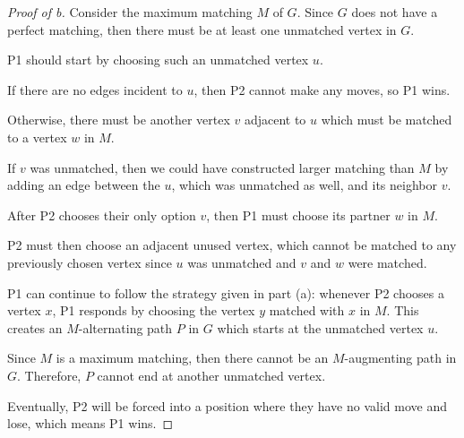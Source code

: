 \documentclass[../hw6]{subfiles}
\begin{document}
\begin{proof}[Proof of b]
	Consider the maximum matching $M$ of $G$.
	Since  $G$ does not have a perfect matching, then there must be at least one unmatched vertex in  $G$.

	P1 should start by choosing such an unmatched vertex $u$.

	If there are no edges incident to $u$, then P2 cannot make any moves, so P1 wins.

	Otherwise, there must be another vertex $v$ adjacent to $u$ which must be matched to a vertex $w$ in $M$.

	If $v$ was unmatched, then we could have constructed larger matching than $M$ by adding an edge between the $u$,
	which was unmatched as well, and its neighbor $v$.

	After P2 chooses their only option $v$, then P1 must choose its partner $w$ in $M$.

	P2 must then choose an adjacent unused vertex, which cannot be matched to any previously chosen vertex since $u$ was unmatched and $v$ and $w$ were matched.

	P1 can continue to follow the strategy given in part (a):
	whenever P2 chooses a vertex $x$, P1 responds by choosing the vertex $y$ matched with  $x$ in $M$.
	This creates an $M$-alternating path $P$ in $G$ which starts at the unmatched vertex $u$.

	Since $M$ is a maximum matching, then there cannot be an  $M$-augmenting path in $G$.
	Therefore, $P$ cannot end at another unmatched vertex.

	Eventually, P2 will be forced into a position where they have no valid move and lose, which means P1 wins.
\end{proof}
\end{document}
